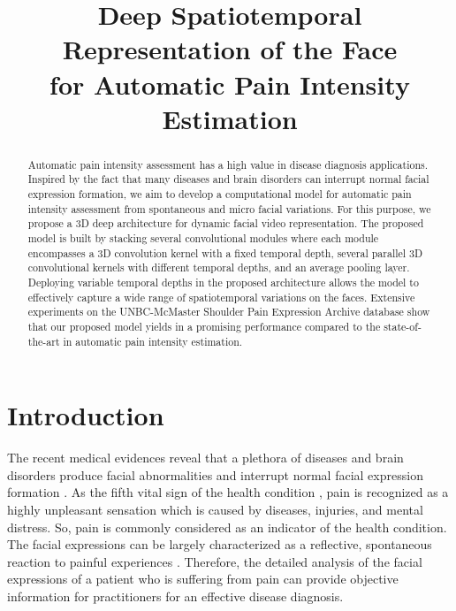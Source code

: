 \documentclass[a4paper,conference]{IEEEtran}
\begin{document}
\title{Deep Spatiotemporal Representation of the Face \\ for Automatic Pain Intensity Estimation}


\author{
}



\maketitle

\begin{abstract}
Automatic pain intensity assessment has a high value in disease diagnosis applications. Inspired by the fact that many diseases and brain disorders can interrupt normal facial expression formation, we aim to develop a computational model for automatic pain intensity assessment from spontaneous and micro facial variations. For this purpose, we propose a 3D deep architecture for dynamic facial video representation. The proposed model is built by stacking several convolutional modules where each module encompasses a 3D convolution kernel with a fixed temporal depth, several parallel 3D convolutional kernels with different temporal depths, and an average pooling layer. Deploying variable temporal depths in the proposed architecture allows the model to effectively capture a wide range of spatiotemporal variations on the faces. Extensive experiments on the UNBC-McMaster Shoulder Pain Expression Archive database show that our proposed model yields in a promising performance compared to the state-of-the-art in automatic pain intensity estimation. 
\end{abstract}


\IEEEpeerreviewmaketitle


\section{Introduction}
\label{Intro}
The recent medical evidences reveal that a plethora of diseases and brain disorders produce facial abnormalities and interrupt normal facial expression formation \cite{c2}. As the fifth vital sign of the health condition \cite{c3}, pain is recognized as a highly unpleasant sensation which is caused by diseases, injuries, and mental distress. So, pain is commonly considered as an indicator of the health condition. The facial expressions can be largely characterized as a reflective, spontaneous reaction to painful experiences \cite{c4}. Therefore, the detailed analysis of the facial expressions of a patient who is suffering from pain can provide objective information for practitioners for an effective disease diagnosis. 
\end{document}
